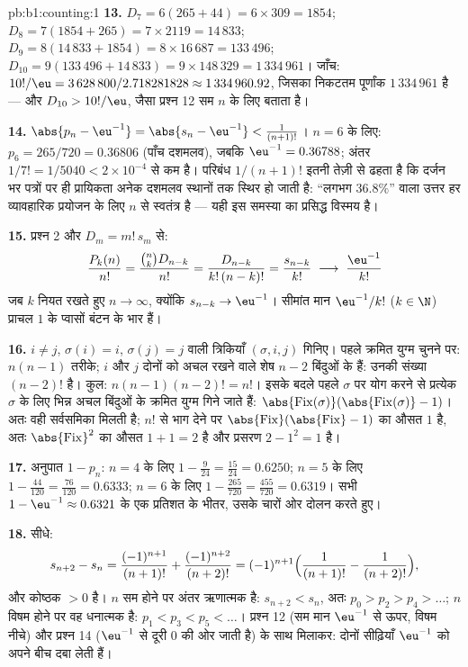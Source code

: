 \begin{solution}{pb:b1:counting:1}
\textbf{13.} $D_7 = 6(265 + 44) = 6 \times 309 = 1854$; $D_8 = 7(1854 + 265)
= 7 \times 2119 = 14\,833$; $D_9 = 8(14\,833 + 1854) = 8 \times 16\,687 =
133\,496$; $D_{10} = 9(133\,496 + 14\,833) = 9 \times 148\,329 =
1\,334\,961$। जाँच: $10!/\eu = 3\,628\,800 / 2.718281828 \approx
1\,334\,960.92$, जिसका निकटतम पूर्णांक $1\,334\,961$ है --- और $D_{10} >
10!/\eu$, जैसा प्रश्न 12 सम $n$ के लिए बताता है।

\textbf{14.} $\abs{p_n - \eu^{-1}} = \abs{s_n - \eu^{-1}} < \frac1{(n+1)!}$।
$n = 6$ के लिए: $p_6 = 265/720 = 0.36806$ (पाँच दशमलव), जबकि $\eu^{-1} =
0.36788$; अंतर $1/7! = 1/5040 < 2 \times 10^{-4}$ से कम है। परिबंध
$1/(n+1)!$ इतनी तेज़ी से ढहता है कि दर्जन भर पत्रों पर ही प्रायिकता अनेक
दशमलव स्थानों तक स्थिर हो जाती है: ``लगभग $36.8\%$'' वाला उत्तर हर
व्यावहारिक प्रयोजन के लिए $n$ से स्वतंत्र है --- यही इस समस्या का प्रसिद्ध
विस्मय है।

\textbf{15.} प्रश्न 2 और $D_m = m!\,s_m$ से:
\[
\frac{P_k(n)}{n!} = \frac{\binom nk D_{n-k}}{n!}
= \frac{D_{n-k}}{k!\,(n-k)!} = \frac{s_{n-k}}{k!}
\;\longrightarrow\; \frac{\eu^{-1}}{k!}
\]
जब $k$ नियत रखते हुए $n \to \infty$, क्योंकि $s_{n-k} \to \eu^{-1}$। सीमांत
मान $\eu^{-1}/k!$ ($k \in \N$) प्राचल $1$ के प्वासों बंटन के भार हैं।

\textbf{16.} $i \neq j$, $\sigma(i) = i$, $\sigma(j) = j$ वाली त्रिकियाँ
$(\sigma, i, j)$ गिनिए। पहले क्रमित युग्म चुनने पर: $n(n-1)$ तरीके; $i$ और
$j$ दोनों को अचल रखने वाले  शेष $n - 2$ बिंदुओं के  हैं: उनकी
संख्या $(n-2)!$ है। कुल: $n(n-1)(n-2)! = n!$। इसके बदले पहले $\sigma$ पर योग
करने से प्रत्येक $\sigma$ के लिए भिन्न अचल बिंदुओं के क्रमित युग्म गिने जाते
हैं: $\abs{\mathrm{Fix}(\sigma)}(\abs{\mathrm{Fix}(\sigma)}-1)$। अतः वही
सर्वसमिका मिलती है; $n!$ से भाग देने पर
$\abs{\mathrm{Fix}}(\abs{\mathrm{Fix}} - 1)$ का औसत $1$ है, अतः
$\abs{\mathrm{Fix}}^2$ का औसत $1 + 1 = 2$ है और प्रसरण $2 - 1^2 = 1$ है।

\textbf{17.} अनुपात $1 - p_n$: $n = 4$ के लिए $1 - \frac 9{24} =
\frac{15}{24} = 0.6250$; $n = 5$ के लिए $1 - \frac{44}{120} = \frac{76}{120}
= 0.6333$; $n = 6$ के लिए $1 - \frac{265}{720} = \frac{455}{720} = 0.6319$।
सभी $1 - \eu^{-1} \approx 0.6321$ के एक प्रतिशत के भीतर, उसके चारों ओर दोलन
करते हुए।

\textbf{18.} सीधे:
\[
s_{n+2} - s_n = \frac{(-1)^{n+1}}{(n+1)!} +
\frac{(-1)^{n+2}}{(n+2)!}
= (-1)^{n+1}\Bigl(\frac1{(n+1)!} - \frac1{(n+2)!}\Bigr),
\]
और कोष्ठक $> 0$ है। $n$ सम होने पर अंतर ऋणात्मक है: $s_{n+2} < s_n$, अतः
$p_0 > p_2 > p_4 > \dots$; $n$ विषम होने पर वह धनात्मक है: $p_1 < p_3 < p_5
< \dots$। प्रश्न 12 (सम मान $\eu^{-1}$ से ऊपर, विषम नीचे) और प्रश्न 14
($\eu^{-1}$ से दूरी $0$ की ओर जाती है) के साथ मिलाकर: दोनों सीढ़ियाँ
$\eu^{-1}$ को अपने बीच दबा लेती हैं।


\end{solution}
